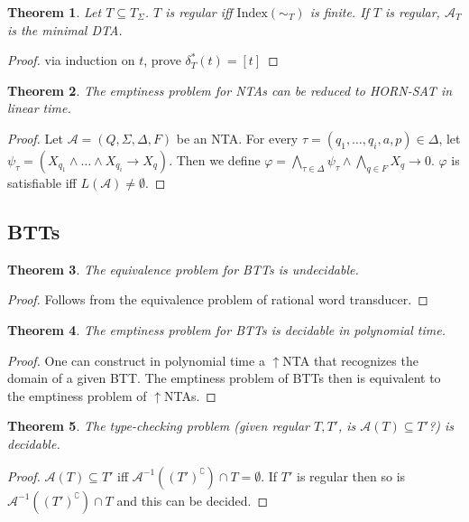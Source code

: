 \documentclass{article}
\newtheorem{theorem}{Theorem}[section]
\begin{document}
\begin{theorem}
	Let $T \subseteq T_\Sigma$. $T$ is regular iff $\text{Index}(\sim_T)$ is finite. If $T$ is regular, $\mathcal{A}_T$ is the minimal DTA.
\end{theorem}
\begin{proof}
	via induction on $t$, prove $\delta_T^*(t) = [t]$
\end{proof}

\begin{theorem}
	The emptiness problem for NTAs can be reduced to \textsf{HORN-SAT} in linear time.
\end{theorem}
\begin{proof}
	Let $\mathcal{A} = (Q, \Sigma, \Delta, F)$ be an NTA. For every $\tau = (q_1, \dots, q_i, a, p) \in \Delta$, let \linebreak $\psi_\tau = (X_{q_1} \land \dots \land X_{q_i} \rightarrow X_q)$. Then we define $\varphi = \bigwedge\limits_{\tau \in \Delta} \psi_\tau \land \bigwedge\limits_{q \in F} X_q \rightarrow 0$. $\varphi$ is satisfiable iff $L(\mathcal{A}) \neq \emptyset$.
\end{proof}

\subsection{BTTs}
\begin{theorem}
	The equivalence problem for BTTs is undecidable.
\end{theorem}
\begin{proof}
	Follows from the equivalence problem of rational word transducer.
\end{proof}

\begin{theorem}
	The emptiness problem for BTTs is decidable in polynomial time.
\end{theorem}
\begin{proof}
	One can construct in polynomial time a $\uparrow$NTA that recognizes the domain of a given BTT. The emptiness problem of BTTs then is equivalent to the emptiness problem of $\uparrow$NTAs.
\end{proof}

\begin{theorem}
	The type-checking problem (given regular $T, T'$, is $\mathcal{A}(T) \subseteq T'$?) is decidable.
\end{theorem}
\begin{proof}
	$\mathcal{A}(T) \subseteq T'$ iff $\mathcal{A}^{-1}((T')^\complement) \cap T = \emptyset$. If $T'$ is regular then so is $\mathcal{A}^{-1}((T')^\complement) \cap T$ and this can be decided.
\end{proof}
\end{document}
